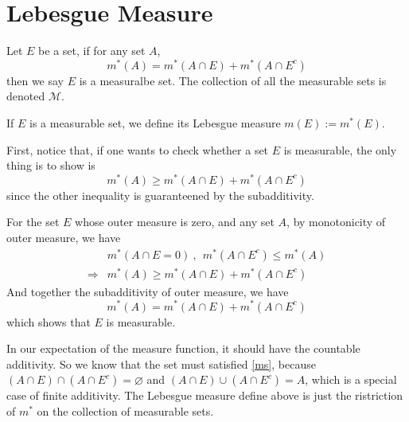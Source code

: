 \documentclass[lang=en, 12pt]{elegantbook}
\begin{document}
        \section{Lebesgue Measure}
            \begin{definition}
                Let $E$ be a set, if for any set $A$, 
                \begin{equation}
                    m^*(A) = m^*(A \cap E) + m^* (A \cap E^c) \label{ms}
                \end{equation}
                then we say $E$ is a measuralbe set. The collection of all the measurable sets is denoted $\mathcal{M}$.\par
                If $E$ is a measurable set, we define its Lebesgue measure $m(E) := m^*(E)$. 
            \end{definition}
            \begin{example}
                First, notice that, if one wants to check whether a set $E$ is measurable, the only thing is to show is 
            $$m^*(A) \geq m^*(A \cap E) + m^* (A \cap E^c)$$
            since the other inequality is guaranteened by the subadditivity.\par 
                For the set $E$ whose outer measure is zero, and any set $A$, by monotonicity of outer measure, we have 
                \begin{equation*}
                    \begin{aligned}
                        &m^*(A \cap E = 0) \ , \ \ m^*(A \cap E^c) \leq m^*(A) \\
                        \Rightarrow &m^*(A) \geq  m^*(A \cap E) + m^* (A \cap E^c)  
                    \end{aligned}
                \end{equation*} 
                And together the subadditivity of outer measure, we have 
                $$m^*(A) = m^*(A \cap E) + m^* (A \cap E^c)$$
                which shows that $E$ is measurable.
            \end{example}
            In our expectation of the measure function, it should have the countable additivity. So we know that the set must satisfied 
        \eqref{ms}, because $(A \cap E) \cap (A \cap E^c) = \varnothing$ and $(A \cap E) \cup (A \cap E^c) = A$, which is a special case 
        of finite additivity. The Lebesgue measure define above is just the ristriction of $m^*$ on the collection of measurable sets. 
\end{document}
